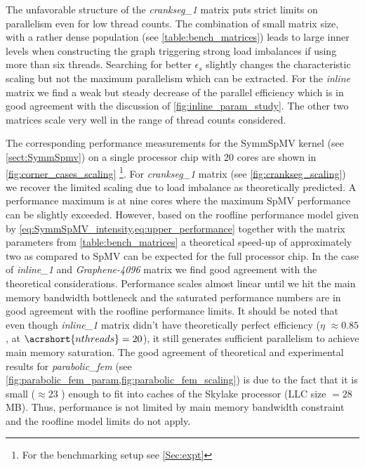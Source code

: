 The unfavorable structure of the \emph{crankseg\_1} matrix puts strict limits on parallelism even for low thread counts.  The combination of small matrix size, with a rather dense population (see \cref{table:bench_matrices}) leads to large inner levels when constructing the graph triggering strong load imbalances if using more than six threads. Searching for better $\epsilon_s$ slightly changes the characteristic scaling but not the maximum parallelism which can be extracted. For the \emph{inline} matrix we find a weak but steady decrease of the parallel efficiency which is in good agreement with the discussion of \cref{fig:inline_param_study}. The other two matrices scale very well in the range of thread counts considered. 

The corresponding performance measurements for the \acrshort{SymmSpMV} kernel (see \cref{sect:SymmSpmv}) on a single \SKX processor chip with 20 cores are shown in \cref{fig:corner_cases_scaling} \footnote{For the benchmarking setup see \cref{Sec:expt}}. 
For \emph{crankseg\_1} matrix (see \cref{fig:crankseg_scaling}) we recover the limited scaling due to load imbalance as theoretically predicted. A performance maximum is at nine cores where the maximum \acrshort{SpMV} performance can be slightly exceeded. However, based on the roofline performance model given by \cref{eq:SymmSpMV_intensity,eq:upper_performance} together with the matrix parameters from \cref{table:bench_matrices} a theoretical speed-up of approximately two as compared to \acrshort{SpMV} can be expected for the full processor chip. 
In the case of \emph{inline\_1} and \emph{Graphene-4096} matrix we find good agreement with the theoretical considerations. Performance scales almost linear until we hit the main memory bandwidth bottleneck and the saturated performance numbers are in good agreement with the roofline performance limits.  
It should be noted that even though \emph{inline\_1} matrix didn't have theoretically perfect efficiency ($\eta$ $\approx 0.85$, at $\acrshort{nthreads}=20$), it still generates sufficient parallelism to achieve main memory saturation. 
The good agreement of theoretical and experimental results for  \emph{parabolic\_fem}  (see \cref{fig:parabolic_fem_param,fig:parabolic_fem_scaling}) is due to the fact that it is small ($\approx 23$ \MB) enough to fit into caches of the Skylake processor (\acrshort{LLC} size $= 28$ MB). Thus, performance is not limited by main memory bandwidth constraint and the roofline model limits do not apply.

